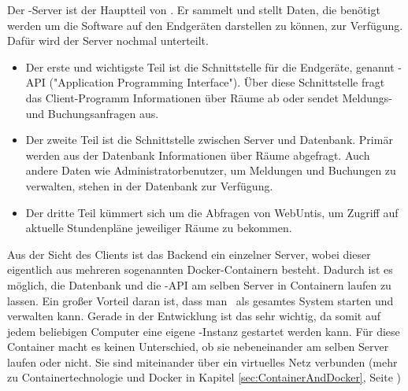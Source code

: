 
Der \ZELIA-Server ist der Hauptteil von \ZELIA. Er sammelt und stellt Daten, die benötigt werden um die Software auf den Endgeräten darstellen zu können, zur Verfügung. Dafür wird der Server nochmal unterteilt.

\begin{itemize}
    \item Der erste und wichtigste Teil ist die Schnittstelle für die Endgeräte, genannt \ZELIA-API ("Application Programming Interface"). Über diese Schnittstelle fragt das Client-Programm Informationen über Räume ab oder sendet Meldungs- und Buchungsanfragen aus.
    \item Der zweite Teil ist die Schnittstelle zwischen Server und Datenbank. Primär werden aus der Datenbank Informationen über Räume abgefragt. Auch andere Daten wie Administratorbenutzer, um Meldungen und Buchungen zu verwalten, stehen in der Datenbank zur Verfügung. 
    \item Der dritte Teil kümmert sich um die Abfragen von WebUntis, um Zugriff auf aktuelle Stundenpläne jeweiliger Räume zu bekommen.
\end{itemize}

Aus der Sicht des Clients ist das Backend ein einzelner Server, wobei dieser eigentlich aus mehreren sogenannten Docker-Containern besteht. Dadurch ist es möglich, die Datenbank und die \ZELIA-API am selben Server in Containern laufen zu lassen. Ein großer Vorteil daran ist, dass man \ZELIA\ als gesamtes System starten und verwalten kann. Gerade in der Entwicklung ist das sehr wichtig, da somit auf jedem beliebigen Computer eine eigene \ZELIA-Instanz gestartet werden kann. Für diese Container macht es keinen Unterschied, ob sie nebeneinander am selben Server laufen oder nicht. Sie sind miteinander über ein virtuelles Netz verbunden (mehr zu Containertechnologie und Docker in Kapitel \ref{sec:ContainerAndDocker}, Seite \pageref{sec:ContainerAndDocker})

